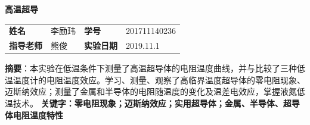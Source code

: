 \documentclass[UTF8]{ctexart}
\begin{document}
\begin{center}
\Huge\textbf{高温超导}
\renewcommand{\baselinestretch}{5.0}
\end{center}
\begin{center}
\small
\begin{tabular}{llll}
\textbf{姓名}&李励玮     &\textbf{学号}  &201711140236\\
\textbf{指导老师}&熊俊 &\textbf{实验日期}& 2019.11.1\\
\end{tabular}
\end{center}

\small
\noindent\textbf{摘要}：本实验在低温条件下测量了高温超导体的电阻温度曲线，并与比较了三种低温温度计的电阻温度效应。学习、测量、观察了高临界温度超导体的零电阻现象、迈斯纳效应；测量了金属和半导体的电阻随温度的变化及温差电效应，掌握液氮低温技术。 
\newline\textbf{关键字：零电阻现象；迈斯纳效应；实用超导体；金属、半导体、超导体电阻温度特性}
\end{document}
